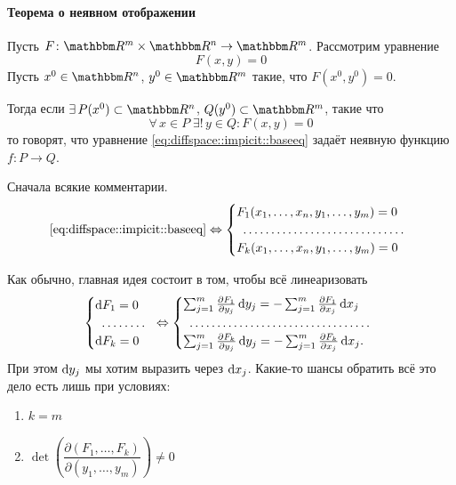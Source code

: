 \documentclass[12pt,timbord]{../../../notes}
\begin{document}
\paragraph{Теорема о неявном отображении}
\label{par:diffspace::implicit}
\begin{defn}\label{defn:diffspace::implicit}
  Пусть $F \colon \R^m\times\R^n \to \R^m$. Рассмотрим уравнение
  \begin{equation}
    F(x, y) = 0
    \label{eq:diffspace::impicit::baseeq}
  \end{equation}
  Пусть $x^0\in \R^n$, $y^0\in \R^m$ такие, что $F(x^0, y^0) = 0$.
 
  Тогда если $\exists\,P(x^0) \subset \R^n$, $Q(y^0) \subset \R^m$, такие что
  \[
    \forall\, x\in P \; \exists!\, y\in Q \colon F(x,y) = 0
  \]
  то говорят, что уравнение \eqref{eq:diffspace::impicit::baseeq} задаёт неявную функцию 
  $f\colon P \to Q$.
\end{defn}

Сначала всякие комментарии.
\begin{equation*}
  \text{\eqref{eq:diffspace::impicit::baseeq}} \Leftrightarrow
  \begin{cases}
    F_1(x_1, \dotsc, x_n, y_1, \dotsc, y_m) = 0 \\
    \hdotsfor{1}\\
    F_k(x_1, \dotsc, x_n, y_1, \dotsc, y_m) = 0 \\
  \end{cases}
\end{equation*}

Как обычно, главная идея состоит в том, чтобы всё линеаризовать
\begin{equation}
  \begin{cases}
    \del F_1 = 0 \\
    \hdotsfor{1}\\
    \del F_k = 0 \\
  \end{cases}
  \Leftrightarrow 
  \begin{cases}
    \sum_{j=1}^m \frac{\partial F_1}{\partial y_j}\, \del y_j = 
    -\sum_{j=1}^m \frac{\partial F_1}{\partial x_j}\, \del x_j \\
    \hdotsfor{1}\\
    \sum_{j=1}^m \frac{\partial F_k}{\partial y_j}\, \del y_j = 
    -\sum_{j=1}^m \frac{\partial F_k}{\partial x_j}\, \del x_j .\\
  \end{cases}\nolinebreak\label{eq:diffspace::impicit::diff}
\end{equation}
При этом $\mathrm{d} y_j$ мы хотим выразить через $\mathrm{d} x_j$.
Какие-то шансы обратить всё это дело есть лишь при условиях:
\begin{enumerate}
  \item $k=m$
  \item $\det \left(\dfrac{\partial(F_1, \dotsc, F_k)}{\partial(y_1, \dotsc, y_m)}\right) \neq 0$
\end{enumerate}
\end{document}
